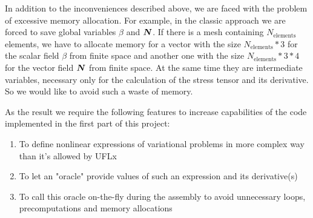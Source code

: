 \documentclass[12pt]{article}
\newcommand{\todounderline}[1]{\todo[inline, size=\scriptsize]{#1}}
\begin{document}

In addition to the inconveniences described above, we are faced with the problem of excessive memory allocation. For example, in the classic approach we are forced to save global variables $\beta$ and $\mbox{\boldmath $N$}$. If there is a mesh containing $N_\text{elements}$ elements, we have to allocate memory for a vector with the size $N_\text{elements}*3$ for the scalar field $\beta$ from  finite space and another one with the size $N_\text{elements}*3*4$ for the vector field $\mbox{\boldmath $N$}$ from  finite space. At the same time they are intermediate variables, necessary only for the calculation of the stress tensor and its derivative. So we would like to avoid such a waste of memory.




As the result we require the following features to increase capabilities of the code implemented in the first part of this project:
\begin{enumerate}
    \item To define nonlinear expressions of variational problems in more complex way than it's allowed by UFLx
    \item To let an "oracle" provide values of such an expression and its derivative(s)
    \item To call this oracle on-the-fly during the assembly to avoid unnecessary loops, precomputations and memory allocations
\end{enumerate}
\end{document}

